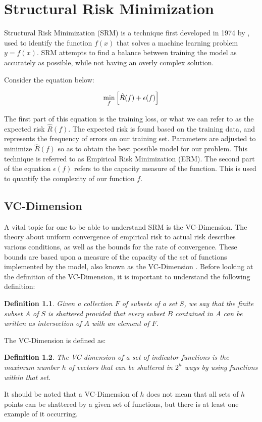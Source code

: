\chapter{Structural Risk Minimization}
\label{ch:structuralriskminimization}


Structural Risk Minimization (SRM) is a technique first developed in 1974 by \citet{vapnikchervonenkis1}, used to identify the function $f(x)$ that solves a machine learning problem $y=f(x)$. SRM attempts to find a balance between training the model as accurately as possible, while not having an overly complex solution.

Consider the equation\citep{srmvapnik512} below:

\begin{equation}\label{srm1}
\centering
\min_{f}{\left[\hat{R}(f)+\epsilon(f)\right]}
\end{equation}

The first part of this equation is the training loss, or what we can refer to as the expected risk $\hat{R}(f)$. The expected risk is found based on the training data, and represents the frequency of errors on our training set. Parameters are adjusted to minimize $\hat{R}(f)$ so as to obtain the best possible model for our problem. This technique is referred to as Empirical Risk Minimization (ERM). The second part of the equation $\epsilon(f)$ refers to the capacity measure of the function. This is used to quantify the complexity of our function $f$.

\section {VC-Dimension} \label{sec:vc-dimension}

A vital topic for one to be able to understand SRM is the VC-Dimension. The theory about uniform convergence of empirical risk to actual risk describes various conditions, as well as the bounds for the rate of convergence. These bounds are based upon a measure of the capacity of the set of functions implemented by the model, also known as the VC-Dimension \citep{srmvapnik506}. Before looking at the definition of the VC-Dimension, it is important to understand the following definition:

\newtheorem{definition}{Definition}
\begin{definition} \label{shatterdefn}
Given a collection $F$ of subsets of a set $S$, we say that the finite subset $A$ of $S$ is shattered provided that every subset $B$ contained in $A$ can be written as intersection of $A$ with an element of $F$. 
\end {definition}
The VC-Dimension is defined\citep{srmvapnik506} as:
\begin{definition} \label{vcdimdefn}
The VC-dimension of a set of indicator functions is the maximum number $h$ of vectors that can be shattered in $2^{h}$ ways by using functions within that set. 
\end {definition}
It should be noted that a VC-Dimension of $h$ does not mean that all sets of $h$ points can be shattered by a given set of functions, but there is at least one example of it occurring.



